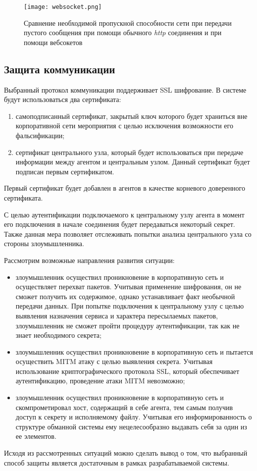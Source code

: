 \begin{figure}[ht]
\centering
	\texttt{[image: websocket.png]}  
	\caption{ Сравнение необходимой пропускной способности сети при передачи пустого сообщения при
помощи обычного \textit{http} соединения и при помощи вебсокетов}
	\label{fig:websocket_http_compare}
\end{figure}

\subsection{Защита коммуникации}

Выбранный протокол коммуникации поддерживает SSL шифрование. В системе будут использоваться два сертификата:
\begin{enumerate}
\item самоподписанный сертификат, закрытый ключ которого будет храниться вне корпоративной сети мероприятия с целью исключения возможности его фальсификации;
\item сертификат центрального узла, который будет использоваться при передаче информации между агентом и центральным узлом. Данный сертификат будет подписан первым сертификатом.
\end{enumerate}

Первый сертификат будет добавлен в агентов в качестве корневого доверенного сертификата.

С целью аутентификации подключаемого к центральному узлу агента   в момент его подключения в начале соединения будет передаваться некоторый секрет. Также данная мера позволяет отслеживать попытки анализа центрального узла со стороны злоумышленника.

Рассмотрим возможные направления развития ситуации:
\begin{itemize}
\item злоумышленник осуществил проникновение в корпоративную сеть и осуществляет перехват пакетов. Учитывая применение шифрования, он не сможет получить их содержимое, однако устанавливает факт необычной передачи данных. При попытке подключения к центральному узлу с целью выявления назначения сервиса и характера пересылаемых пакетов, злоумышленник не сможет пройти процедуру аутентификации, так как не знает необходимого секрета;
\item злоумышленник осуществил проникновение в корпоративную сеть и пытается осуществить MITM атаку с целью выявления секрета. Учитывая использование криптографического протокола SSL, который обеспечивает аутентификацию, проведение атаки MITM невозможно;
\item злоумышленник осуществил проникновение в корпоративную сеть и скомпрометировал хост, содержащий в себе агента, тем самым получив доступ к секрету и исполняемому файлу. Учитывая его информированность о структуре обманной системы ему нецелесообразно выдавать себя за один из ее элементов.
\end{itemize}

Исходя из рассмотренных ситуаций можно сделать вывод о том, что выбранный способ защиты является достаточным в рамках разрабатываемой системы.